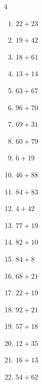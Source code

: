 \begin{multicols}{4}
\begin{enumerate}
  \item $22+23$
        \phantom{$=45$}

  \item $19+42$
        \phantom{$=61$}

  \item $18+61$
        \phantom{$=79$}

  \item $13+14$
        \phantom{$=27$}

  \item $63+67$
        \phantom{$=130$}

  \item $96+70$
        \phantom{$=166$}

  \item $69+31$
        \phantom{$=100$}

  \item $60+79$
        \phantom{$=139$}

  \item $6+19$
        \phantom{$=25$}

  \item $46+88$
        \phantom{$=134$}

  \item $84+83$
        \phantom{$=167$}

  \item $4+42$
        \phantom{$=46$}

  \item $77+19$
        \phantom{$=96$}

  \item $82+10$
        \phantom{$=92$}

  \item $84+8$
        \phantom{$=92$}

  \item $68+21$
        \phantom{$=89$}

  \item $22+19$
        \phantom{$=41$}

  \item $92+21$
        \phantom{$=113$}

  \item $57+18$
        \phantom{$=75$}

  \item $12+35$
        \phantom{$=47$}

  \item $16+13$
        \phantom{$=29$}

  \item $54+62$
        \phantom{$=116$}


\end{enumerate}
\end{multicols}
